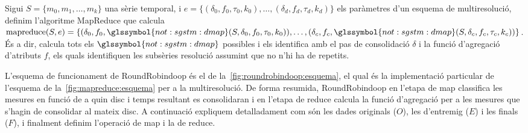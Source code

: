 Sigui $S=\{m_0,m_1,\dotsc,m_k\}$ una sèrie temporal, i $e = \{
(\delta_0,f_0,\tau_0,k_0),\ldots, (\delta_d,f_d,\tau_d,k_d)\}$ els
paràmetres d'un esquema de multiresolució, definim l'algoritme
MapReduce que calcula $\operatorname{mapreduce}(S,e) = \{
(\delta_0,f_0,
\glssymbol{not:sgstm:dmap}(S,\delta_0,f_0,\tau_0,k_0)),\dotsc,
(\delta_c,f_c,\glssymbol{not:sgstm:dmap}(S,\delta_c,f_c,\tau_c,k_c))
\}$. És a dir, calcula tots els $\glssymbol{not:sgstm:dmap}$ possibles
i els identifica amb el pas de consolidació $\delta$ i la funció
d'agregació d'atributs $f$, els quals identifiquen les subsèries
resolució assumint que no n'hi ha de repetits.





L'esquema de funcionament de RoundRobindoop és el de
la~\autoref{fig:roundrobindoop:esquema}, el qual és la implementació
particular de l'esquema de la~\autoref{fig:mapreduce:esquema} per a la
multiresolució.  De forma resumida, RoundRobindoop en l'etapa de map
classifica les mesures en funció de a quin disc i temps resultant es
consolidaran i en l'etapa de reduce calcula la funció d'agregació per
a les mesures que s'hagin de consolidar al mateix disc.  A continuació
expliquem detalladament com són les dades originals ($O$), les
d'entremig ($E$) i les finals ($F$), i finalment definim l'operació de
map i la de reduce.





